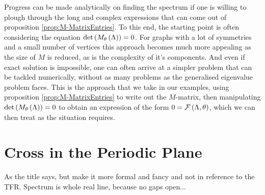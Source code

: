 Progress can be made analytically on finding the spectrum if one is willing to plough through the long and complex expressions that can come out of proposition \ref{prop:M-MatrixEntries}.
To this end, the starting point is often considering the equation $\det\left( M_{\theta}\left( \Lambda \right) \right)=0$.
For graphs with a lot of symmetries and a small number of vertices this approach becomes much more appealing as the size of $M$ is reduced, as is the complexity of it's components.
And even if exact solution is impossible, one can often arrive at a simpler problem that can be tackled numerically, without as many problems as the generalised eigenvalue problem faces.
This is the approach that we take in our examples, using proposition \ref{prop:M-MatrixEntries} to write out the $M$-matrix, then manipulating $\det\left( M_{\theta}\left( \Lambda \right) \right)=0$ to obtain an expression of the form $0 = \mathcal{F}\left( \Lambda, \theta \right)$, which we can then treat as the situation requires.

\section{Cross in the Periodic Plane} \label{sec:ExampleCrossInPlane}
As the title says, but make it more formal and fancy and not in reference to the TFR. 
Spectrum is whole real line, because no gaps open...

